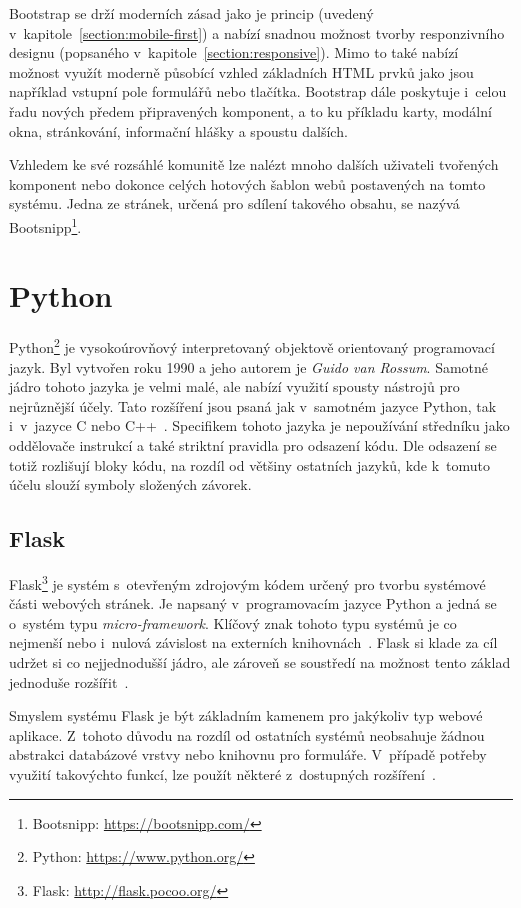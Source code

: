 Bootstrap se drží moderních zásad jako je princip  (uvedený v~kapitole~\ref{section:mobile-first}) a nabízí snadnou možnost tvorby responzivního designu (popsaného v~kapitole~\ref{section:responsive}). Mimo to také nabízí možnost využít moderně působící vzhled základních HTML prvků jako jsou například vstupní pole formulářů nebo tlačítka. Bootstrap dále poskytuje i~celou řadu nových předem připravených komponent, a to ku příkladu karty, modální okna, stránkování, informační hlášky a spoustu dalších.

Vzhledem ke své rozsáhlé komunitě lze nalézt mnoho dalších uživateli tvořených komponent nebo dokonce celých hotových šablon webů postavených na tomto systému. Jedna ze stránek, určená pro sdílení takového obsahu, se nazývá Bootsnipp\footnote{Bootsnipp: \url{https://bootsnipp.com/}}.



\section{Python}
Python\footnote{Python: \url{https://www.python.org/}} je vysokoúrovňový interpretovaný objektově orientovaný programovací jazyk. Byl vytvořen roku 1990 a jeho autorem je \emph{Guido van Rossum}. Samotné jádro tohoto jazyka je velmi malé, ale nabízí využití spousty nástrojů pro nejrůznější účely. Tato rozšíření jsou psaná jak v~samotném jazyce Python, tak i~v~jazyce C nebo C++~\cite{bib:python}. Specifikem tohoto jazyka je nepoužívání středníku jako oddělovače instrukcí a také striktní pravidla pro odsazení kódu. Dle odsazení se totiž rozlišují bloky kódu, na rozdíl od většiny ostatních jazyků, kde k~tomuto účelu slouží symboly složených závorek. 


\subsection{Flask}
Flask\footnote{Flask: \url{http://flask.pocoo.org/}} je systém s~otevřeným zdrojovým kódem určený pro tvorbu systémové části webových stránek. Je napsaný v~programovacím jazyce Python a jedná se o~systém typu \emph{micro-framework}. Klíčový znak tohoto typu systémů je co nejmenší nebo i~nulová závislost na externích knihovnách~\cite{bib:flask-doc}.
Flask si klade za cíl udržet si co nejjednodušší jádro, ale zároveň se soustředí na možnost tento základ jednoduše rozšířit~\cite{bib:flask-pym}.

Smyslem systému Flask je být základním kamenem pro jakýkoliv typ webové aplikace. Z~tohoto důvodu na rozdíl od ostatních systémů neobsahuje žádnou abstrakci databázové vrstvy nebo knihovnu pro formuláře. V~případě potřeby využití takovýchto funkcí, lze použít některé z~dostupných rozšíření~\cite{bib:flask-design}.

